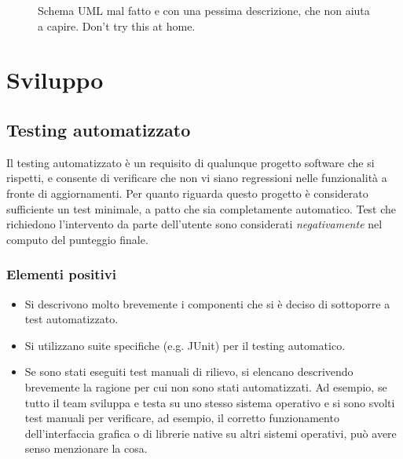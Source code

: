 \documentclass[a4paper,12pt]{report}
\begin{document}
\begin{figure}[h]
\centering{}
\caption{Schema UML mal fatto e con una pessima descrizione, che non aiuta a capire. Don't try this at home.}
\label{img:badarch}
\end{figure}


\chapter{Sviluppo}
\section{Testing automatizzato}

Il testing automatizzato è un requisito di qualunque progetto software che si rispetti, e consente di verificare che non vi siano regressioni nelle funzionalità a fronte di aggiornamenti.
%
Per quanto riguarda questo progetto è considerato sufficiente un test minimale, a patto che sia completamente automatico.
%
Test che richiedono l'intervento da parte dell'utente sono considerati \textit{negativamente} nel computo del punteggio finale.

\subsection*{Elementi positivi}

\begin{itemize}
 \item Si descrivono molto brevemente i componenti che si è deciso di sottoporre a test automatizzato.
 \item Si utilizzano suite specifiche (e.g. JUnit) per il testing automatico.
 \item Se sono stati eseguiti test manuali di rilievo, si elencano descrivendo brevemente la ragione per cui non sono stati automatizzati. Ad esempio, se tutto il team sviluppa e testa su uno stesso sistema operativo e si sono svolti test manuali per verificare, ad esempio, il corretto funzionamento dell'interfaccia grafica o di librerie native su altri sistemi operativi, può avere senso menzionare la cosa.
\end{itemize}
\end{document}
